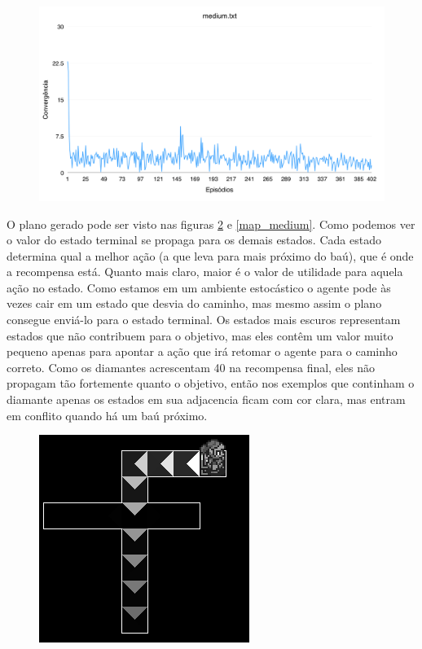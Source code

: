 \documentclass[letterpaper]{article}
\begin{document}
\begin{figure}[ht]
\centering
\includegraphics[scale=0.18]{medium_map.png}
\caption{}
\label{medi_conv}
\end{figure}

O plano gerado pode ser visto nas figuras \ref{map_easy} e \ref{map_medium}. Como podemos ver o valor do estado terminal se propaga para os demais estados. Cada estado determina qual a melhor ação (a que leva para mais próximo do baú), que é onde a recompensa está. Quanto mais claro, maior é o valor de utilidade para aquela ação no estado. Como estamos em um ambiente estocástico o agente pode às vezes cair em um estado que desvia do caminho, mas mesmo assim o plano consegue enviá-lo para o estado terminal. Os estados mais escuros representam estados que não contribuem para o objetivo, mas eles contêm um valor muito pequeno apenas para apontar a ação que irá retomar o agente para o caminho correto. Como os diamantes acrescentam 40 na recompensa final, eles não propagam tão fortemente quanto o objetivo, então nos exemplos que continham o diamante apenas os estados em sua adjacencia ficam com cor clara, mas entram em conflito quando há um baú próximo.

\begin{figure}[ht]
\centering
\includegraphics[scale=0.6]{easy.png}
\caption{}
\label{map_easy}
\end{figure}
\end{document}
